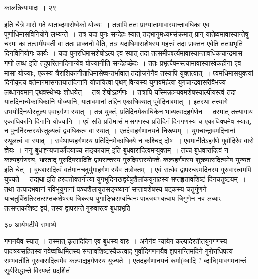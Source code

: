 \documentclass[11pt, openany]{book}
\begin{document}
{\vspace{3cm} \hspace{4cm}कालक्रियापादः~।\hspace{4cm} २९

\vspace{0.3cm}
\noindent इति चैत्रे मासे गते याताब्दमासेष्वेको योज्यः~। तत्रापि ततः प्राग्यातामावास्यान्तावधिका एव पूर्णाधिमासविनियोगे लभ्यन्ते~। तत्र यदा पुनः सन्देहः स्यात् तद्भानुमध्यमसंक्रमात् प्राग् यातेष्वमावास्यान्तेषु चरमः कः तत्समीपवर्ती वा ततः प्राक्तनो वेति, तत्र यदाधिमासशेषस्य महत्त्वं तदा प्राक्तन एवेति ततःप्रभृति दिनविनियोगः कार्यः~। यदा पुनरधिमासशेषोऽल्प एव स्यात् तदा तत्समीपवर्त्यमावास्यान्तावधिकचान्द्रमास गणो लब्ध इति तदुपरितनदिनान्येव योज्यानीति सन्देहच्छेदः~। ततः प्रभृत्यैषमस्त्यामावास्यास्वेकहीना एव मासा योज्याः, एकस्य त्रैराशिकानीताधिमासेष्वन्तर्भावात् तद्योजनेनैव तस्यापि युक्तत्वात्~। एवमधिमासयुक्त्यां दिनीकृत्य वर्तमानमासगतयातदिनानि योजयित्वा पृथग् विन्यस्य युगावमैर्हत्वा युगचान्द्रवासरैर्विभज्य लब्धानवमान् पृथक्स्थेभ्यः
शोधयेत्~। तत्र शेषोऽहर्गणः~। तत्रापि यस्मिन्नहन्यवमशेषस्याल्पीयस्त्वं तदा यातदिनान्येकाधिकानि योज्यानि, यातावमानां तद्दिन एकाधिक्यात् पूर्वदिनावमात्~। इतरथा तत्त्यागे उभयोर्दिनयोस्तुल्य एवाहर्गणः स्यात्~। तन्न युक्तं, प्रतिदिनमेकाधिकेन भाव्यत्वादहर्गणेन~। तस्मात् तत्त्यागाय
एकाधिकानि दिनानि योज्यानि~। एवं सति प्रतिमासं मासगणस्य प्रतिदिनं दिनगणस्य च एकाधिक्यमेव स्यात्, न पुनर्निरन्तरयोस्तुल्यत्वं द्व्यधिकत्वं वा स्यात्~। एतदेवाहर्गणानयने निरूप्यम्~। युगचान्द्रावमदिनानां स्थूलत्वं वा स्यात्~। सर्वथाप्यहर्गणस्य प्रतिदिनमेकाधिक्ये न कश्चिद् दोषः~। एवमानीतेऽहर्गणे गुर्वादिरेव वारो ज्ञेयः~। ननु {\qt बुधाह्न्यजार्कोदयाच्च लङ्कायाम्} इति बुधवारादित्वमप्युक्तम्~। तच्च बुधवारादित्वं न कल्यहर्गणस्य, भारताद् गुरुदिवसादिति द्वापरान्तस्य गुरुदिवसस्योक्तेः कल्यहर्गणस्य शुक्रवारादित्वमेव युज्यत इति चेत्~। बुधवारादित्वं वर्तमानचतुर्युगाहर्गण स्यैव तत्रोक्तम्~। एवं सत्येव द्वापरचरमदिनस्य गुरुवारत्वमपि युज्यते~। तद्यथा  इति हरदत्तोक्तनीत्या युगभूदिनखद्वयेषुशैलांकयुगाहस्य सप्तहृतावशिष्टं दिनचतुष्टयम्~। तथा तत्पादभवानां रविभूयुगानां पञ्चशैलायुतसङ्ख्यानां सप्तावशेषस्य षट्कस्य चतुर्गुणने याचतुर्विंशतिस्तत्सप्तकशेषस्य त्रिकस्य युगाङ्घ्रिसम्बन्धिनः पादत्रयभवत्वाय
त्रिगुणेन नव लब्धाः, तत्सप्तकशिष्टं द्वयं, तस्य द्वापरान्ते गुरुवारत्वं बुधप्रभृति
\newpage

\vspace{3cm} ३० \hspace{4cm}आर्यभटीये सभाष्ये

\vspace{0.3cm}
\noindent गणनयैव स्यात्~। तस्मात् कृतादिदिन एव बुधस्य वारः~। अनेनैव न्यायेन कल्पादेरतीतयुगगणस्य पादत्रयसहितस्य नवेष्वब्धिमितस्य सप्तावशिष्टस्यैकत्वाद् गुर्वादिगणनयैव द्वापरान्तिमदिने गुरोराधिपत्यं सम्भवतीति गुरुवारादित्वमेव कल्पाद्यहर्गणस्य युज्यते~। एतदहर्गणानयनं कर्मा(ब्धादि ? ब्दाधि)पावगमनान्तं सूर्यसिद्धान्ते विस्पष्टं प्रदर्शितं\textendash

}
\end{document}
